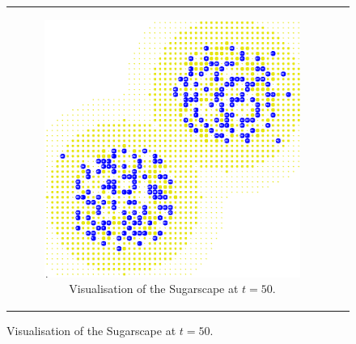 \begin{figure}
\begin{center}
	\begin{tabular}{c c}
		\begin{subfigure}[b]{0.4\textwidth}
			\centering
			\includegraphics[width=1\textwidth, angle=0]{./fig/sugarscape/vis/sugarscape_t60_environment.png}
			\caption{Visualisation of the Sugarscape at $t = 50$.}
			\label{fig:vis_sugarscape_t50_environment}
		\end{subfigure}
    	
    	&
  

\end{tabular}
\end{center}
\end{figure}
